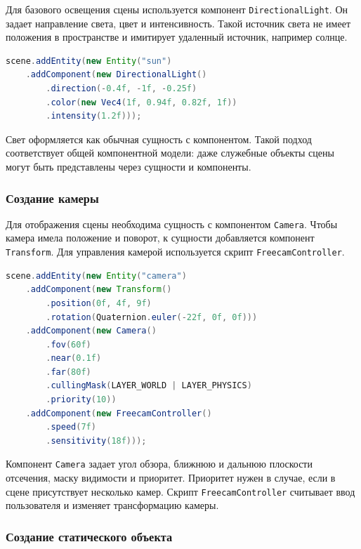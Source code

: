 Для базового освещения сцены используется компонент \texttt{DirectionalLight}. Он задает направление света, цвет и интенсивность. Такой источник света не имеет положения в пространстве и имитирует удаленный источник, например солнце.

\begin{lstlisting}[language=Java,caption={Создание направленного источника света}]
scene.addEntity(new Entity("sun")
    .addComponent(new DirectionalLight()
        .direction(-0.4f, -1f, -0.25f)
        .color(new Vec4(1f, 0.94f, 0.82f, 1f))
        .intensity(1.2f)));
\end{lstlisting}

Свет оформляется как обычная сущность с компонентом. Такой подход соответствует общей компонентной модели: даже служебные объекты сцены могут быть представлены через сущности и компоненты.

\subsubsection{Создание камеры}

Для отображения сцены необходима сущность с компонентом \texttt{Camera}. Чтобы камера имела положение и поворот, к сущности добавляется компонент \texttt{Transform}. Для управления камерой используется скрипт \texttt{FreecamController}.

\begin{lstlisting}[language=Java,caption={Создание свободной камеры}]
scene.addEntity(new Entity("camera")
    .addComponent(new Transform()
        .position(0f, 4f, 9f)
        .rotation(Quaternion.euler(-22f, 0f, 0f)))
    .addComponent(new Camera()
        .fov(60f)
        .near(0.1f)
        .far(80f)
        .cullingMask(LAYER_WORLD | LAYER_PHYSICS)
        .priority(10))
    .addComponent(new FreecamController()
        .speed(7f)
        .sensitivity(18f)));
\end{lstlisting}

Компонент \texttt{Camera} задает угол обзора, ближнюю и дальнюю плоскости отсечения, маску видимости и приоритет. Приоритет нужен в случае, если в сцене присутствует несколько камер. Скрипт \texttt{FreecamController} считывает ввод пользователя и изменяет трансформацию камеры.

\subsubsection{Создание статического объекта}

